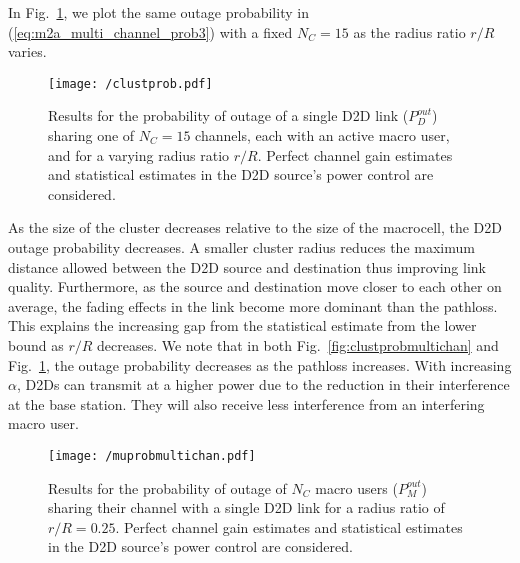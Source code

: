 \documentclass[10pt, final, journal, letterpaper,oneside, twocolumn]{IEEEtran}
\begin{document}
In Fig.~\ref{fig:clustprob}, we plot the same outage probability in (\ref{eq:m2a_multi_channel_prob3}) with a fixed $N_C = 15$ as the radius ratio $r/R$ varies.
\begin{figure}[htp]
\center
 \texttt{[image: /clustprob.pdf]}
  \caption[]{Results for the probability of outage of a single D2D link ($P^{out}_{D}$) sharing one of $N_C=15$ channels, each with an active macro user, and for a varying radius ratio $r/R$. Perfect channel gain estimates and statistical estimates in the D2D source's power control are considered. }
  \label{fig:clustprob}
\end{figure}
As the size of the cluster decreases relative to the size of the macrocell, the D2D outage probability decreases.  A smaller cluster radius reduces the maximum distance allowed between the D2D source and destination thus improving link quality.  Furthermore, as the source and destination move closer to each other on average, the fading effects in the link become more dominant than the pathloss.  This explains the increasing gap from the statistical estimate from the lower bound as $r/R$ decreases.  We note that in both Fig.~\ref{fig:clustprobmultichan} and Fig.~\ref{fig:clustprob}, the outage probability decreases as the pathloss increases.  With increasing $\alpha$, D2Ds can transmit at a higher power due to the reduction in their interference at the base station.  They will also receive less interference from an interfering macro user.  
\begin{figure}[htp]
\center
 \texttt{[image: /muprobmultichan.pdf]}
  \caption[]{Results for the probability of outage of $N_C$ macro users ($P^{out}_{M}$) sharing their channel with a single D2D link for a radius ratio of $r/R = 0.25$. Perfect channel gain estimates and statistical estimates in the D2D source's power control are considered. }
  \label{fig:MUprobmultichan}
\end{figure}
\end{document}
